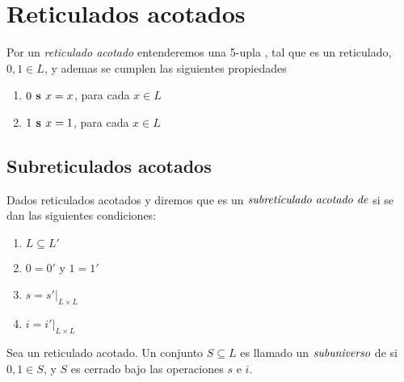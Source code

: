 
  \section{Reticulados acotados}
  \begin{definition}
    Por un \emph{reticulado acotado} entenderemos una 5-upla \reticulAcot, tal que \reticulAlg
    es un reticulado, $0, 1 \in L$, y ademas se cumplen las siguientes propiedades
    \begin{enumerate}
      \item $0\textbf{ s }x = x$, para cada $x \in L$
      \item $1\textbf{ s }x = 1$, para cada $x \in L$
    \end{enumerate}
  \end{definition}

  \subsection{Subreticulados acotados}
  \begin{definition}
    Dados reticulados acotados \reticulAcot y  diremos que \reticulAcot
    es un $\emph{subreticulado acotado de}$  si se dan las siguientes condiciones:
    \begin{enumerate}
      \item $L \subseteq L'$
      \item $0 = 0'$ y $1 = 1'$
      \item $s = s'\vert_{L \times L}$
      \item $i = i'\vert_{L \times L}$
    \end{enumerate}

    Sea \reticulAcot un reticulado acotado. Un conjunto $S \subseteq L$ es llamado un $\emph{subuniverso}$ de
    \reticulAcot si $0, 1 \in S$, y $S$ es cerrado bajo las operaciones $s$ e $i$.
  \end{definition}

